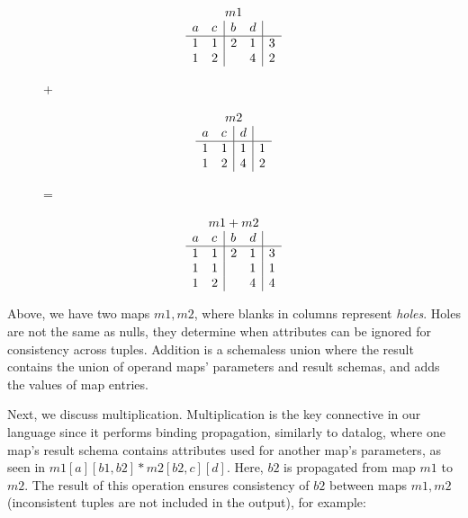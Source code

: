 \vspace{-7mm}
\begin{figure}[h]
\begin{minipage}{1in}
\[
\begin{array}{ll|ll|l}
\multicolumn{5}{c}{m1}\\
 a & c & b & d & \\
\hline
 1 & 1 & 2 & 1 & 3 \\
\comment{
 1 & 2 & 4 & 2 & 1 \\
 1 & 2 & 3 & 3 & 4 \\
}
 1 & 2 &   & 4 & 2
\end{array}
\]
\end{minipage}
+
\begin{minipage}{0.85in}
\[
\begin{array}{ll|l|l}
\multicolumn{4}{c}{m2}\\
 a & c & d & \\
\hline
 1 & 1 & 1 & 1 \\
 1 & 2 & 4 & 2 \\
\end{array}
\]
\end{minipage}
=
\begin{minipage}{1in}
\[
\begin{array}{ll|ll|l}
\multicolumn{5}{c}{m1 + m2}\\
 a & c & b & d & \\
\hline
 1 & 1 & 2 & 1 & 3 \\
 1 & 1 &   & 1 & 1 \\
\comment{
 1 & 2 & 4 & 2 & 1 \\
 1 & 2 & 3 & 3 & 4 \\
}
 1 & 2 &   & 4 & 4
\end{array}
\]
\end{minipage}
\end{figure}

\vspace{-3mm}
\noindent Above, we have two maps $m1, m2$, where blanks in columns represent
\textit{holes}. Holes are not the same as nulls, they determine when attributes
can be ignored for consistency across tuples.
Addition is a schemaless union where the result contains the union of
operand maps' parameters and result schemas, and adds the values of map entries.

Next, we discuss multiplication. Multiplication is the key
connective in our language since it performs binding propagation, similarly to
datalog, where one map's result schema contains attributes used for
another map's parameters, as seen in $m1[a][b1,b2] * m2[b2,c][d]$.
Here, $b2$ is propagated from map $m1$ to $m2$. The result of this
operation ensures consistency of $b2$ between maps $m1, m2$ (inconsistent
tuples are not included in the output), for example:

